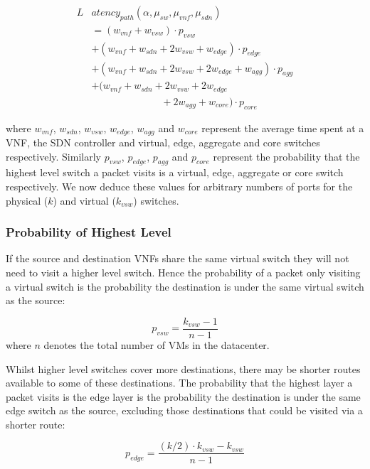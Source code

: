 \begin{equation} 
\label{eq:mean_latency}
\begin{split}
L&atency_{path}(\alpha, \mu_{sw}, \mu_{vnf}, \mu_{sdn}) \\
		&=(w_{vnf} + w_{vsw}) \cdot p_{vsw} \\
		&+ (w_{vnf} + w_{sdn} + 2w_{vsw} + w_{edge}) \cdot p_{edge} \\
	 	&+ (w_{vnf} + w_{sdn} + 2w_{vsw} + 2w_{edge} + w_{agg}) \cdot p_{agg} \\
	 	&+ (w_{vnf} + w_{sdn} + 2w_{vsw} + 2w_{edge}  \\
		& \qquad\qquad\qquad\quad + 2w_{agg} + w_{core})\cdot p_{core}
\end{split}
\end{equation}

where $w_{vnf}$, $w_{sdn}$, $w_{vsw}$, $w_{edge}$, $w_{agg}$ and $w_{core}$ represent the average time spent at a VNF, the SDN controller and virtual, edge, aggregate and core switches respectively. Similarly $p_{vsw}$, $p_{edge}$, $p_{agg}$ and $p_{core}$ represent the probability that the highest level switch a packet visits is a virtual, edge, aggregate or core switch respectively. We now deduce these values for arbitrary numbers of ports for the physical ($k$) and virtual ($k_{vsw}$) switches.

\subsubsection{Probability of Highest Level}
If the source and destination VNFs share the same virtual switch they will not need to visit a higher level switch. Hence the probability of a packet only visiting a virtual switch is the probability the destination is under the same virtual switch as the source:

\begin{equation}
\label{eq:p_vm}
p_{vsw} = \frac{k_{vsw} - 1}{n - 1}
\end{equation}
where $n$ denotes the total number of VMs in the datacenter.

Whilst higher level switches cover more destinations, there may be shorter routes available to some of these destinations. The probability that the highest layer a packet visits is the edge layer is the probability the destination is under the same edge switch as the source, excluding those destinations that could be visited via a shorter route:

\begin{equation}
\label{eq:p_edge}
p_{edge} = \frac{(k/2) \cdot k_{vsw} - k_{vsw}}{n - 1}
\end{equation}

